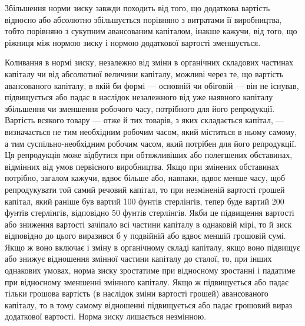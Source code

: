 Збільшення норми зиску завжди походить від того, що додаткова
вартість відносно або абсолютно збільшується порівняно
з витратами її виробництва, тобто порівняно з сукупним авансованим
капіталом, інакше кажучи, від того, що ріжниця між
нормою зиску і нормою додаткової вартості зменшується.

Коливання в нормі зиску, незалежно від зміни в органічних
складових частинах капіталу чи від абсолютної величини капіталу,
можливі через те, що вартість авансованого капіталу,
в якій би формі — основній чи обіговій — він не існував,
підвищується або падає в наслідок незалежного від уже наявного
капіталу збільшення чи зменшення робочого часу, потрібного
для його репродукції. Вартість всякого товару — отже
й тих товарів, з яких складається капітал, — визначається не
тим необхідним робочим часом, який міститься в ньому самому,
а тим суспільно-необхідним робочим часом, який потрібен для
його репродукції. Ця репродукція може відбутися при обтяжливіших
або полегшених обставинах, відмінних від умов первісного
виробництва. Якщо при змінених обставинах потрібно,
загалом кажучи, вдвоє більше або, навпаки, вдвоє менше часу,
щоб репродукувати той самий речовий капітал, то при незміненій
вартості грошей капітал, який раніше був вартий 100 фунтів
стерлінгів, тепер буде вартий 200 фунтів стерлінгів, відповідно
50 фунтів стерлінгів. Якби це підвищення вартості або
зниження вартості зачіпало всі частини капіталу в однаковій
мірі, то й зиск відповідно до цього виразився б у подвійній
або вдвоє меншій грошовій сумі. Якщо ж воно включає і зміну
в органічному складі капіталу, якщо воно підвищує або знижує
відношення змінної частини капіталу до сталої, то, при інших
однакових умовах, норма зиску зростатиме при відносному
зростанні і падатиме при відносному зменшенні змінного капіталу.
Якщо ж підвищується або падає тільки грошова вартість
(в наслідок зміни вартості грошей) авансованого капіталу, то
в тому самому відношенні підвищується або падає грошовий вираз
додаткової вартості. Норма зиску лишається незмінною.
